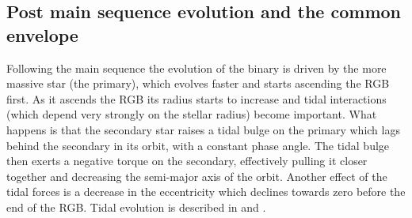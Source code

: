 \documentclass[twoside,openright,titlepage,numbers=noenddot,headinclude,%
                footinclude=true,cleardoublepage=empty,abstractoff, 
                BCOR=5mm,paper=a4,fontsize=11pt,%
                american,%
                ]{scrreprt}%
\begin{document}
\subsection{Post main sequence evolution and the common envelope}
\label{sub:Post main sequence evolution and the common envelope}
Following the main sequence the evolution of the binary is driven by
the more massive star (the primary), which evolves faster and starts
ascending the RGB first. As it ascends the RGB its radius starts to increase
and tidal interactions (which depend very strongly on the stellar radius)
become important. What happens is that the secondary star raises a tidal bulge
on the primary which lags behind the secondary in its orbit, with a constant
phase angle. The tidal bulge then exerts a negative torque on the secondary,
effectively pulling it closer together and decreasing the semi-major axis of
the orbit. Another effect of the tidal forces is a decrease in the eccentricity
which declines towards zero before the end of the RGB. Tidal evolution
is described in \citet{murray} and \citet{zahn1989a, zahn1989b}.
\end{document}
